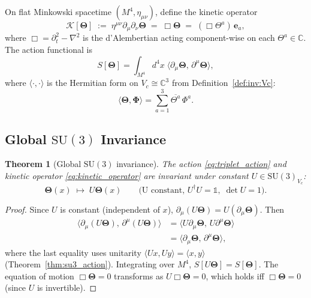 \documentclass[12pt,a4paper]{article}
\newtheorem{theorem}{Theorem}[section]
\theoremstyle{remark}
\newcommand{\C}{\mathbb{C}}
\begin{document}
On flat Minkowski spacetime $(M^4,\eta_{\mu\nu})$, define the kinetic operator
\begin{equation}
  \label{eq:kinetic_operator}
  \mathcal{K}[\boldsymbol{\Theta}]
  \;:=\;
  \eta^{\mu\nu}\partial_\mu\partial_\nu\boldsymbol{\Theta}
  \;=\;
  \Box\boldsymbol{\Theta}
  \;=\;
  (\Box\Theta^a)\,\mathbf{e}_a,
\end{equation}
where $\Box = \partial_t^2 - \nabla^2$ is the d'Alembertian acting
component-wise on each $\Theta^a\in\C$.  The action functional is
\begin{equation}
  \label{eq:triplet_action}
  S[\boldsymbol{\Theta}]
  = \int_{M^4} d^4x\;
    \langle\partial_\mu\boldsymbol{\Theta},\,\partial^\mu\boldsymbol{\Theta}\rangle,
\end{equation}
where $\langle\cdot,\cdot\rangle$ is the Hermitian form on $V_c\cong\C^3$
from Definition~\ref{def:inv:Vc}:
\begin{equation}
  \langle\boldsymbol{\Theta},\boldsymbol{\Phi}\rangle
  = \sum_{a=1}^3 \overline{\Theta^a}\,\Phi^a.
\end{equation}

\subsection{Global $\mathrm{SU}(3)$ Invariance}

\begin{theorem}[Global $\mathrm{SU}(3)$ invariance]
  \label{thm:global_su3}
  The action \eqref{eq:triplet_action} and kinetic operator
  \eqref{eq:kinetic_operator} are invariant under constant
  $U\in\mathrm{SU}(3)_{V_c}$:
  \begin{equation}
    \boldsymbol{\Theta}(x) \;\mapsto\; U\boldsymbol{\Theta}(x)
    \qquad\text{(U constant, } U^\dagger U = \mathbb{1},\; \det U = 1).
  \end{equation}
\end{theorem}

\begin{proof}
  Since $U$ is constant (independent of $x$), $\partial_\mu(U\boldsymbol{\Theta})
  = U(\partial_\mu\boldsymbol{\Theta})$.  Then
  \begin{align}
    \langle\partial_\mu(U\boldsymbol{\Theta}),\,\partial^\mu(U\boldsymbol{\Theta})\rangle
    &= \langle U\partial_\mu\boldsymbol{\Theta},\,U\partial^\mu\boldsymbol{\Theta}\rangle
    \nonumber\\
    &= \langle\partial_\mu\boldsymbol{\Theta},\,\partial^\mu\boldsymbol{\Theta}\rangle,
  \end{align}
  where the last equality uses unitarity $\langle Ux,Uy\rangle=\langle x,y\rangle$
  (Theorem~\ref{thm:su3_action}).  Integrating over $M^4$,
  $S[U\boldsymbol{\Theta}]=S[\boldsymbol{\Theta}]$.  The equation of motion
  $\Box\boldsymbol{\Theta}=0$ transforms as $U\Box\boldsymbol{\Theta}=0$, which
  holds iff $\Box\boldsymbol{\Theta}=0$ (since $U$ is invertible).
\end{proof}
\end{document}
